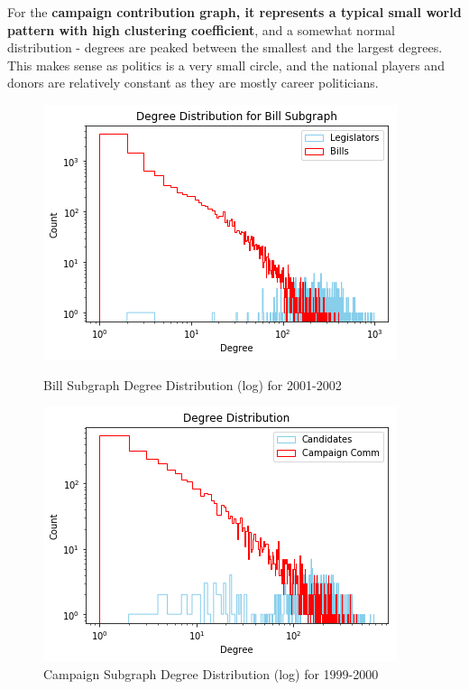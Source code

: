 \documentclass[12pt,twocolumn]{article}
\begin{document}
For the \textbf{campaign contribution graph, it represents a typical small world pattern with high clustering coefficient}, and a somewhat normal distribution - degrees are peaked between the smallest and the largest degrees. This makes sense as politics is a very small circle, and the national players and donors are relatively constant as they are mostly career politicians.  
\begin{figure}
\centering
\begin{minipage}{0.45\linewidth}

\includegraphics[width=\linewidth]{2000_bill_degrees_log}
\caption{Bill Subgraph Degree Distribution (log) for 2001-2002}
\label{fig:2000_bill_degrees_log}
\end{minipage}\hfill
\begin{minipage}{0.45\linewidth}

\includegraphics[width=\linewidth]{2000_campaign_degrees_log}
\caption{Campaign Subgraph Degree Distribution (log) for 1999-2000}
\label{fig:2000_campaign_degrees_log}
 \end{minipage}
\end{figure}
\end{document}
